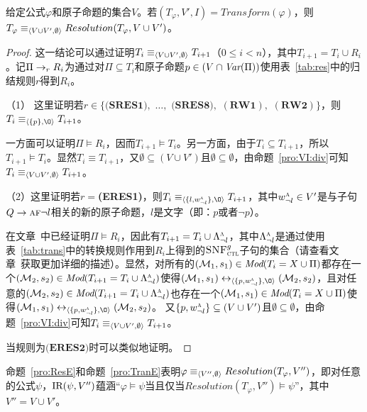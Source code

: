\begin{proposition}
	\label{pro:ResE}
	给定公式$\varphi$和原子命题的集合$V$。若$(T_{\varphi}, V', I) = Transform(\varphi)$，则$T_{\varphi} \equiv_{{\langle{V\cup V', \emptyset}\rangle}} Resolution(T_{\varphi}, V \cup V')$。
\end{proposition}
\begin{proof}
这一结论可以通过证明$T_i \equiv_{{\langle{V\cup V', \emptyset}\rangle}} T_{i+1}$（$0\leq i < n$），其中$T_{i+1}=T_i\cup R_i$。记$\Pi\rightarrow_r R_i$为通过对$\Pi\subseteq T_i$和原子命题$p\in (V\cap \textit{Var}(\Pi))$使用表~\ref{tab:res}中的归结规则$r$得到$R_i$。

（1）	这里证明若$r\in \{\textbf{(SRES1)},$ $\dots,$ $\textbf{(SRES8)},$ $(\textbf{RW1}),$ $(\textbf{RW2})\}$，则$T_i \equiv_{\tuple{\{p\}, {\O}}} T_{i+1}$。

一方面可以证明$\Pi\models R_i$，因而$T_{i+1} \models T_i$。另一方面，由于$T_i\subseteq T_{i+1}$，所以$T_{i+1} \models T_i$。显然$T_i \equiv T_{i+1}$，又$\emptyset \subseteq (V\cup V')$且$\emptyset \subseteq \emptyset$，由命题~\ref{pro:VI:div}可知$T_i \equiv_{{\langle{V\cup V', \emptyset}\rangle}} T_{i+1}$。

（2）这里证明若$r=$\textbf{(ERES1)}，则$T_i \equiv_{\tuple{\{l, w_{\neg l}^{\ALL}\}, {\O}}} T_{i+1}$，其中$w_{\neg l}^{\textsc{a}}\in V'$是与子句$Q \rightarrow \textsc{a} \textsc{f} \neg l$相关的新的原子命题，$l$是文字（即：$p$或者$\neg p$）。

在文章~\cite{bolotov2000clausal}中已经证明$\Pi \models R_i$，因此有$T_{i+1}=T_i \cup \Lambda_{\neg l}^{\textsc{a}}$，其中$\Lambda_{\neg l}^{\textsc{a}}$是通过使用表~\ref{tab:trans}中的转换规则作用到$R_i$上得到的${\textsc{SNF}_{\textsc{ctl}}^g}$子句的集合（请查看文章~\cite{zhang2009refined}获取更加详细的描述）。显然，对所有的$({\cal M}_1,s_1) \in \textit{Mod}(T_i= X \cup \Pi)$都存在一个$({\cal M}_2, s_2)\in \textit{Mod}(T_{i+1}=T_i \cup \Lambda_{\neg l}^{\textsc{a}})$使得$(\Hm_1, s_1) \lrto_{\tuple{\{p, w_{\neg l}^{\ALL}\}, {\O}}} (\Hm_2, s_2)$，且对任意的$({\cal M}_2, s_2)\in \textit{Mod}(T_{i+1}=T_i \cup \Lambda_{\neg l}^{\textsc{a}})$也存在一个$({\cal M}_1,s_1) \in \textit{Mod}(T_i= X \cup \Pi)$使得$(\Hm_1, s_1) \lrto_{\tuple{\{p, w_{\neg l}^{\ALL}\}, {\O}}} (\Hm_2, s_2)$。
又$\{p, w_{\neg l}^{\textsc{a}}\} \subseteq (V\cup V')$且$\emptyset \subseteq \emptyset$，由命题~\ref{pro:VI:div}可知$T_i \equiv_{{\langle{V\cup V', \emptyset}\rangle}} T_{i+1}$。

当规则为$\textbf{(ERES2)}$时可以类似地证明。
\end{proof}

命题~\ref{pro:ResE}和命题~\ref{pro:TranE}表明$\varphi \equiv_{{\langle{V'', \emptyset}\rangle}} Resolution(T_{\varphi}, V'')$，即对任意的公式$\psi$，$\textrm{IR}(\psi, V'')$蕴涵“$\varphi \models \psi$当且仅当$Resolution(T_{\varphi}, V'') \models \psi$”，其中$V''=V\cup V'$。

